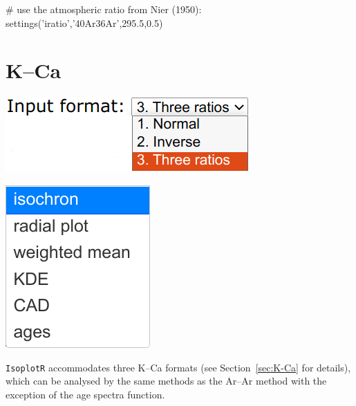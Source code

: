 \begin{refsection}
\begin{script}
# use the atmospheric ratio from Nier (1950):
settings('iratio','40Ar36Ar',295.5,0.5)
\end{script}

\section{K--Ca}\label{sec:KCa-R}

\noindent\begin{minipage}[t]{.3\linewidth}
\strut\vspace*{-\baselineskip}\newline
\includegraphics[width=\linewidth]{../figures/PbPbFormats.png}
\end{minipage}
\noindent\begin{minipage}[t]{.15\linewidth}
\strut\vspace*{-\baselineskip}\newline
\includegraphics[width=\linewidth]{../figures/PbPbPlotdevices.png}
\end{minipage}
\begin{minipage}[t]{.55\textwidth}
  \texttt{IsoplotR} accommodates three K--Ca formats (see
  Section~\ref{sec:K-Ca} for details), which can be analysed by the
  same methods as the Ar--Ar method with the exception of the age
  spectra function.
\end{minipage}


\end{refsection}
